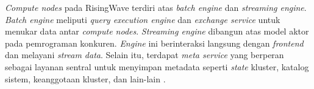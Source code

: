 \textit{Compute nodes} pada RisingWave terdiri atas \textit{batch engine} dan \textit{streaming engine}. \textit{Batch engine} meliputi \textit{query execution engine} dan \textit{exchange service} untuk menukar data antar \textit{compute nodes}. \textit{Streaming engine} dibangun atas model aktor pada pemrograman konkuren. \textit{Engine} ini berinteraksi langsung dengan \textit{frontend} dan melayani \textit{stream data}. Selain itu, terdapat \textit{meta service} yang berperan sebagai layanan sentral untuk menyimpan metadata seperti \textit{state} kluster, katalog sistem, keanggotaan kluster, dan lain-lain \parencite{risingwave}.